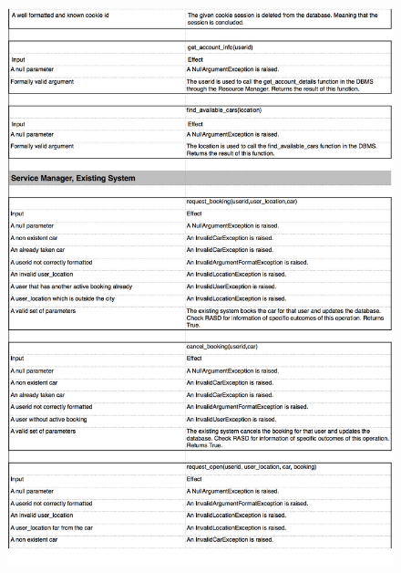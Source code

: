\documentclass[a4paper,10pt]{article}
\begin{document}
    \begin{figure}[!h]
  \centering
    \includegraphics[scale=0.26]{Resources/3.jpg}
  \end{figure}
\end{document}
